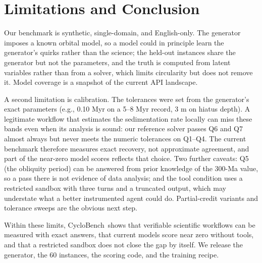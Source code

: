 \documentclass[10pt]{article}
\newcommand{\method}{CycloBench}
\begin{document}
\section{Limitations and Conclusion}
\label{sec:conclusion}
Our benchmark is synthetic, single-domain, and English-only. The generator imposes a known
orbital model, so a model could in principle learn the generator's quirks rather than the
science; the held-out instances share the generator but not the parameters, and the truth is
computed from latent variables rather than from a solver, which limits circularity but does not
remove it. Model coverage is a snapshot of the current API landscape.

A second limitation is calibration. The tolerances were set from the generator's exact
parameters (e.g., 0.10 Myr on a 5--8 Myr record, 3 m on hiatus depth). A legitimate workflow
that estimates the sedimentation rate locally can miss these bands even when its analysis is
sound: our reference solver passes Q6 and Q7 almost always but never meets the numeric
tolerances on Q1--Q4. The current benchmark therefore measures exact recovery, not approximate
agreement, and part of the near-zero model scores reflects that choice. Two further
caveats: Q5 (the obliquity period) can be answered from prior knowledge of the 300-Ma
value, so a pass there is not evidence of data analysis; and the tool condition uses a
restricted sandbox with three turns and a truncated output, which may understate what a
better instrumented agent could do. Partial-credit
variants and tolerance sweeps are the obvious next step.

Within these limits, \method\ shows that verifiable scientific workflows can be measured with
exact answers, that current models score near zero without tools, and that a restricted sandbox
does not close the gap by itself. We release the generator, the 60 instances, the scoring code,
and the training recipe.



\end{document}
